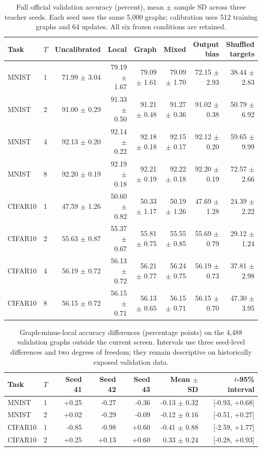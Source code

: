 \begin{table}[t]
\centering\footnotesize
\begin{tabular}{llrrrrrr}
\toprule
Task & $T$ & Uncalibrated & Local & Graph & Mixed & Output bias & Shuffled targets \\
\midrule
MNIST & 1 & 71.99 $\pm$ 3.04 & 79.19 $\pm$ 1.67 & 79.09 $\pm$ 1.61 & 79.09 $\pm$ 1.70 & 72.15 $\pm$ 2.93 & 38.44 $\pm$ 2.83 \\
MNIST & 2 & 91.00 $\pm$ 0.29 & 91.33 $\pm$ 0.50 & 91.21 $\pm$ 0.48 & 91.27 $\pm$ 0.36 & 91.02 $\pm$ 0.38 & 50.79 $\pm$ 6.92 \\
MNIST & 4 & 92.13 $\pm$ 0.20 & 92.14 $\pm$ 0.22 & 92.18 $\pm$ 0.18 & 92.15 $\pm$ 0.17 & 92.12 $\pm$ 0.20 & 59.65 $\pm$ 9.99 \\
MNIST & 8 & 92.20 $\pm$ 0.19 & 92.19 $\pm$ 0.18 & 92.21 $\pm$ 0.19 & 92.22 $\pm$ 0.18 & 92.20 $\pm$ 0.19 & 72.57 $\pm$ 2.66 \\
\midrule
CIFAR10 & 1 & 47.59 $\pm$ 1.26 & 50.60 $\pm$ 0.82 & 50.33 $\pm$ 1.17 & 50.19 $\pm$ 1.26 & 47.69 $\pm$ 1.28 & 24.39 $\pm$ 2.22 \\
CIFAR10 & 2 & 55.63 $\pm$ 0.87 & 55.37 $\pm$ 0.67 & 55.81 $\pm$ 0.75 & 55.55 $\pm$ 0.85 & 55.69 $\pm$ 0.79 & 29.12 $\pm$ 1.24 \\
CIFAR10 & 4 & 56.19 $\pm$ 0.72 & 56.13 $\pm$ 0.72 & 56.21 $\pm$ 0.77 & 56.24 $\pm$ 0.75 & 56.19 $\pm$ 0.73 & 37.81 $\pm$ 2.98 \\
CIFAR10 & 8 & 56.15 $\pm$ 0.72 & 56.15 $\pm$ 0.71 & 56.13 $\pm$ 0.65 & 56.15 $\pm$ 0.71 & 56.15 $\pm$ 0.70 & 47.30 $\pm$ 3.95 \\
\bottomrule
\end{tabular}
\caption{Full official validation accuracy (percent), mean $\pm$ sample SD across three teacher seeds. Each seed uses the same 5,000 graphs; calibration uses 512 training graphs and 64 updates. All six frozen conditions are retained.}
\label{tab:validation}
\end{table}

\begin{table}[t]
\centering\small
\begin{tabular}{llrrrrr}
\toprule
Task & $T$ & Seed 41 & Seed 42 & Seed 43 & Mean $\pm$ SD & $t$-95\% interval \\
\midrule
MNIST & 1 & +0.25 & -0.27 & -0.36 & -0.13 $\pm$ 0.32 & [-0.93, +0.68] \\
MNIST & 2 & +0.02 & -0.29 & -0.09 & -0.12 $\pm$ 0.16 & [-0.51, +0.27] \\
CIFAR10 & 1 & -0.85 & -0.98 & +0.60 & -0.41 $\pm$ 0.88 & [-2.59, +1.77] \\
CIFAR10 & 2 & +0.25 & +0.13 & +0.60 & 0.33 $\pm$ 0.24 & [-0.28, +0.93] \\
\bottomrule
\end{tabular}
\caption{Graph-minus-local accuracy differences (percentage points) on the 4,488 validation graphs outside the current screen. Intervals use three seed-level differences and two degrees of freedom; they remain descriptive on historically exposed validation data.}
\label{tab:paired}
\end{table}

